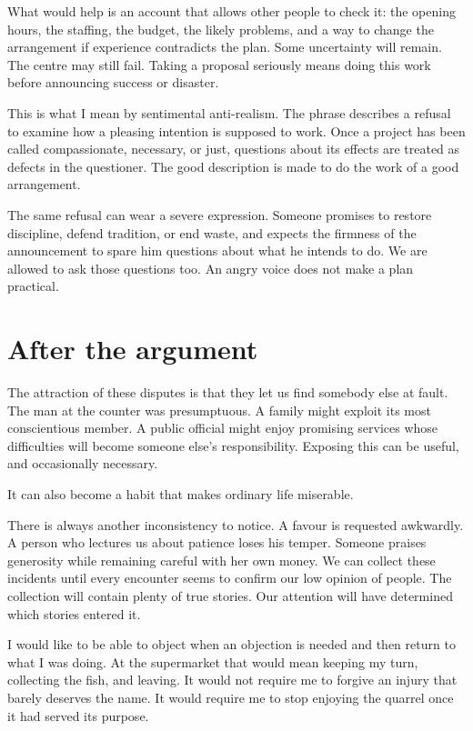 \documentclass[12pt,a4paper]{book}
\begin{document}
What would help is an account that allows other people to check it: the opening hours, the staffing, the budget, the likely problems, and a way to change the arrangement if experience contradicts the plan. Some uncertainty will remain. The centre may still fail. Taking a proposal seriously means doing this work before announcing success or disaster.

This is what I mean by sentimental anti-realism. The phrase describes a refusal to examine how a pleasing intention is supposed to work. Once a project has been called compassionate, necessary, or just, questions about its effects are treated as defects in the questioner. The good description is made to do the work of a good arrangement.

The same refusal can wear a severe expression. Someone promises to restore discipline, defend tradition, or end waste, and expects the firmness of the announcement to spare him questions about what he intends to do. We are allowed to ask those questions too. An angry voice does not make a plan practical.

\section*{After the argument}

The attraction of these disputes is that they let us find somebody else at fault. The man at the counter was presumptuous. A family might exploit its most conscientious member. A public official might enjoy promising services whose difficulties will become someone else's responsibility. Exposing this can be useful, and occasionally necessary.

It can also become a habit that makes ordinary life miserable.

There is always another inconsistency to notice. A favour is requested awkwardly. A person who lectures us about patience loses his temper. Someone praises generosity while remaining careful with her own money. We can collect these incidents until every encounter seems to confirm our low opinion of people. The collection will contain plenty of true stories. Our attention will have determined which stories entered it.

I would like to be able to object when an objection is needed and then return to what I was doing. At the supermarket that would mean keeping my turn, collecting the fish, and leaving. It would not require me to forgive an injury that barely deserves the name. It would require me to stop enjoying the quarrel once it had served its purpose.
\end{document}
